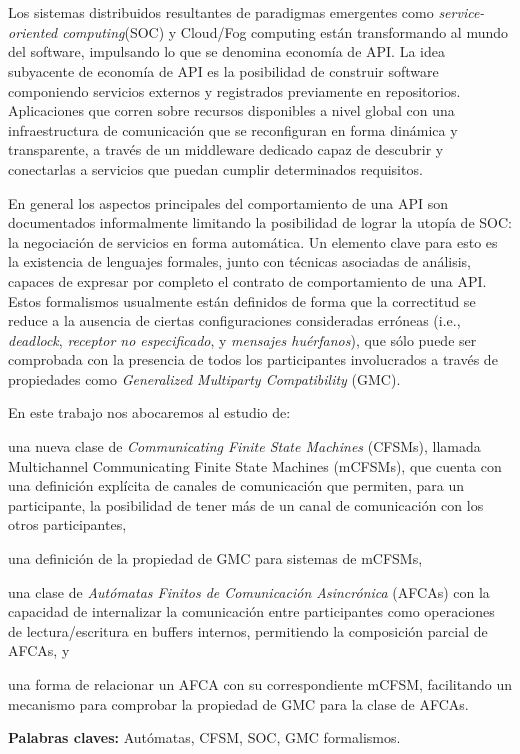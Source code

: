 \chapter*{\runtitulo}

Los sistemas distribuidos resultantes de paradigmas emergentes como \emph{service-oriented computing}(SOC) y Cloud/Fog computing están transformando al mundo del software, impulsando lo que se denomina economía de API. La idea subyacente de economía de API es la posibilidad de construir software componiendo servicios externos y registrados previamente en repositorios. Aplicaciones que corren sobre recursos disponibles a nivel global con una infraestructura de comunicación que se reconfiguran en forma dinámica y transparente, a través de un middleware dedicado capaz de descubrir y conectarlas a servicios que puedan cumplir determinados requisitos. 

En general los aspectos principales del comportamiento de una API son documentados informalmente limitando la posibilidad de lograr la utopía de SOC: la negociación de servicios en forma automática. Un elemento clave para esto es la existencia de lenguajes formales, junto con técnicas asociadas de análisis, capaces de expresar por completo el contrato de comportamiento de una API. Estos formalismos usualmente están definidos de forma que la correctitud se reduce a la ausencia de ciertas configuraciones consideradas erróneas (i.e., \emph{deadlock}, \emph{receptor no especificado}, y \emph{mensajes huérfanos}), que sólo puede ser comprobada con la presencia de todos los participantes involucrados a través de propiedades como \emph{Generalized Multiparty Compatibility} (GMC).

En este trabajo nos abocaremos al estudio de: 
\begin{inparaenum}[1)] 
\item una nueva clase de \emph{Communicating Finite State Machines} (CFSMs), llamada Multichannel Communicating Finite State Machines (mCFSMs), que cuenta con una definición explícita de canales de comunicación que permiten, para un participante, la posibilidad de tener más de un canal de comunicación con los otros participantes, 
\item una definición de la propiedad de GMC para sistemas de mCFSMs,
\item una clase de \emph{Autómatas Finitos de Comunicación Asincrónica} (AFCAs) con la capacidad de internalizar la comunicación entre participantes como operaciones de lectura/escritura en buffers internos, permitiendo la composición parcial de AFCAs, y
\item una forma de relacionar un AFCA con su correspondiente mCFSM, facilitando un mecanismo para comprobar la propiedad de GMC para la clase de AFCAs.
\end{inparaenum}

\bigskip

\noindent\textbf{Palabras claves:} Autómatas, CFSM, SOC, GMC formalismos.